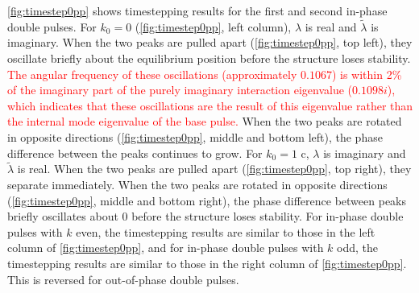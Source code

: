 \documentclass[12pt]{elsarticle}
\newcommand{\revised}[1]{ \textcolor{red}{#1} }
\begin{document}
\cref{fig:timestep0pp} shows timestepping results for the first and second in-phase double pulses. For $k_0 = 0$ (\cref{fig:timestep0pp}, left column), $\lambda$ is real and $\tilde{\lambda}$ is imaginary. When the two peaks are pulled apart (\cref{fig:timestep0pp}, top left), they oscillate briefly about the equilibrium position before the structure loses stability. \revised{The angular frequency of these oscillations (approximately $0.1067$) is within 2\% of the imaginary part of the purely imaginary interaction eigenvalue ($0.1098i$), which indicates that these oscillations are the result of this eigenvalue rather than the internal mode eigenvalue of the base pulse.} When the two peaks are rotated in opposite directions (\cref{fig:timestep0pp}, middle and bottom left), the phase difference between the peaks continues to grow. For $k_0 = 1$ c, $\lambda$ is imaginary and $\tilde{\lambda}$ is real. When the two peaks are pulled apart (\cref{fig:timestep0pp}, top right), they separate immediately. When the two peaks are rotated in opposite directions (\cref{fig:timestep0pp}, middle and bottom right), the phase difference between peaks briefly oscillates about 0 before the structure loses stability. For in-phase double pulses with $k$ even, the timestepping results are similar to those in the left column of \cref{fig:timestep0pp}, and for in-phase double pulses with $k$ odd, the timestepping results are similar to those in the right column of \cref{fig:timestep0pp}. This is reversed for out-of-phase double pulses.
\end{document}

